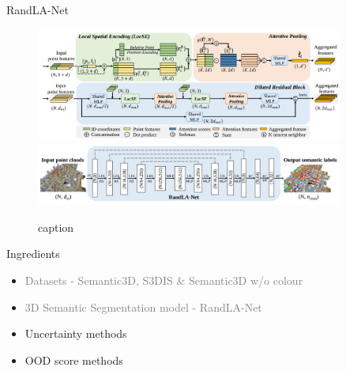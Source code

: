 \documentclass[aspectratio=169]{beamer}
\begin{document}
\begin{frame}{RandLA-Net}
    \begin{figure}
        \centering
        \includegraphics[width = 0.9\textwidth, height=0.37\textheight]{images/randlanet_dires_block.jpg}
        \includegraphics[width = 0.9\textwidth, height=0.37\textheight]{images/randlanet_model.jpg}
        \caption{caption}
        \label{fig:randla_model}
    \end{figure}
\end{frame}
\begin{frame}[noframenumbering]{Ingredients}
    \begin{itemize}
        \item \textcolor{gray}{Datasets - Semantic3D, S3DIS \& Semantic3D w/o colour}
        \item \textcolor{gray}{3D Semantic Segmentation model - RandLA-Net}
        \item Uncertainty methods
        \item OOD score methods
    \end{itemize}
\end{frame}
\end{document}
